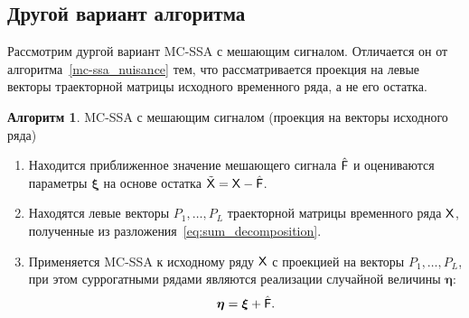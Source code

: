 \documentclass[specialist,
substylefile = spbu_report.rtx,
subf,href,colorlinks=true, 12pt]{disser}
\theoremstyle{definition}
\newtheorem{algorithm}{Алгоритм}
\newcommand{\bfxi}{\boldsymbol{\xi}}
\begin{document}
\subsection{Другой вариант алгоритма}
Рассмотрим дургой вариант MC-SSA с мешающим сигналом. Отличается он от алгоритма~\ref{mc-ssa_nuisance} тем, что рассматривается проекция на левые векторы траекторной матрицы исходного временного ряда, а не его остатка.
\begin{algorithm}{MC-SSA с мешающим сигналом (проекция на векторы исходного ряда)}\label{mc-ssa_nuisance_new}
	\begin{enumerate}
		\item Находится приближенное значение мешающего сигнала $\hat{\mathsf{F}}$ и оцениваются параметры $\bfxi$ на основе остатка $\tilde{\mathsf{X}}=\mathsf{X}-\hat{\mathsf{F}}$.
		\item Находятся левые векторы $P_1,\ldots,P_L$ траекторной матрицы временного ряда $\mathsf{X}$, полученные из разложения~\eqref{eq:sum_decomposition}. 
		\item Применяется MC-SSA к исходному ряду $\mathsf{X}$ с проекцией на векторы $P_1,\ldots,P_L$, при этом суррогатными рядами являются реализации случайной величины $\boldsymbol{\eta}$:
		\[
		\boldsymbol{\eta} = \bfxi + \hat\tF.
		\]
	\end{enumerate}
\end{algorithm}
\end{document}
